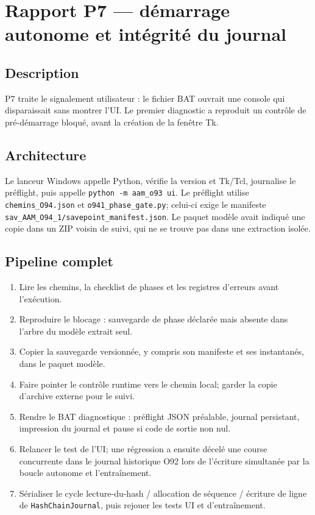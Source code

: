 \documentclass[11pt,a4paper]{article}
\begin{document}
\section{Rapport P7 — démarrage autonome et intégrité du journal}
\subsection{Description}
P7 traite le signalement utilisateur : le fichier BAT ouvrait une console qui disparaissait sans montrer l'UI. Le premier diagnostic a reproduit un contrôle de pré-démarrage bloqué, avant la création de la fenêtre Tk.

\subsection{Architecture}
Le lanceur Windows appelle Python, vérifie la version et Tk/Tcl, journalise le préflight, puis appelle \texttt{python -m aam\_o93 ui}. Le préflight utilise \texttt{chemins\_O94.json} et \texttt{o941\_phase\_gate.py}; celui-ci exige le manifeste \texttt{sav\_AAM\_O94\_1/savepoint\_manifest.json}. Le paquet modèle avait indiqué une copie dans un ZIP voisin de suivi, qui ne se trouve pas dans une extraction isolée.

\subsection{Pipeline complet}
\begin{enumerate}
\item Lire les chemins, la checklist de phases et les registres d'erreurs avant l'exécution.
\item Reproduire le blocage : sauvegarde de phase déclarée mais absente dans l'arbre du modèle extrait seul.
\item Copier la sauvegarde versionnée, y compris son manifeste et ses instantanés, dans le paquet modèle.
\item Faire pointer le contrôle runtime vers le chemin local; garder la copie d'archive externe pour le suivi.
\item Rendre le BAT diagnostique : préflight JSON préalable, journal persistant, impression du journal et pause si code de sortie non nul.
\item Relancer le test de l'UI; une régression a ensuite décelé une course concurrente dans le journal historique O92 lors de l'écriture simultanée par la boucle autonome et l'entraînement.
\item Sérialiser le cycle lecture-du-hash / allocation de séquence / écriture de ligne de \texttt{HashChainJournal}, puis rejouer les tests UI et d'entraînement.
\end{enumerate}
\end{document}
